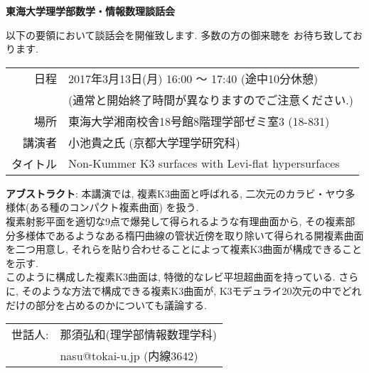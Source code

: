 \documentclass[12pt]{jarticle}
\title{}
\author{}
\date{}
\theoremstyle{definition}
\begin{document}

\begin{center}
 {\bf \Huge 東海大学理学部数学・情報数理談話会}
\end{center}

{\Large
以下の要領において談話会を開催致します. 多数の方の御来聴を
お待ち致しております. 

\smallskip

\begin{center}
  \begin{tabular}{rl}
    日程 & 2017年3月13日(月) 16:00 〜 17:40 (途中10分休憩)\\
    & (通常と開始終了時間が異なりますのでご注意ください.)\\
    場所 & 東海大学湘南校舎18号館8階理学部ゼミ室3 (18-831)\\
    講演者 & 小池貴之氏 (京都大学理学研究科)\\
    タイトル & Non-Kummer K3 surfaces with Levi-flat hypersurfaces\\
  \end{tabular}
\end{center}

\bigskip

\noindent
{\bf アブストラクト}:
本講演では, 複素K3曲面と呼ばれる, 
二次元のカラビ・ヤウ多様体(ある種のコンパクト複素曲面) を扱う.\\
複素射影平面を適切な9点で爆発して得られるような有理曲面から, その複素部分多様体であるようなある楕円曲線の管状近傍を取り除いて得られる開複素曲面を二つ用意し, それらを貼り合わせることによって複素K3曲面が構成できることを示す.\\
このように構成した複素K3曲面は, 特徴的なレビ平坦超曲面を持っている. さらに, そのような方法で構成できる複素K3曲面が, K3モデュライ20次元の中でどれだけの部分を占めるのかについても議論する.
\vskip 2cm
}
\begin{flushright}
  \begin{tabular}{rl}
      世話人: & 那須弘和(理学部情報数理学科)\\
      & nasu@tokai-u.jp (内線3642)
  \end{tabular}

\end{flushright}
\end{document}
